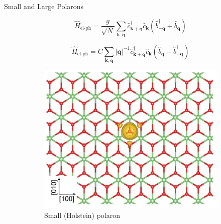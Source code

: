 \documentclass[11pt, xcolor=dvipsnames, aspectratio=43]{beamer}
\newcommand{\oper}[1]{\hat{#1}}
\renewcommand{\vec}[1]{\mathbf{\boldsymbol{#1}}}
\newcommand{\adjoint}[1]{#1^\dagger}
\newcommand{\adjop}[1]{\adjoint{\oper{#1}}}
\begin{document}
\begin{frame}{Small and Large Polarons}
    \begin{minipage}{0.49\textwidth}
        \footnotesize
        \begin{equation*}
            \oper{H}_\text{el-ph} = \frac{g}{\sqrt{N}}\sum_{\vec{k}, \vec{q}} \adjop{c}_{\vec{k}+\vec{q}} \oper{c}_\vec{k} (\adjop{b}_{-\vec{q}} + \oper{b}_\vec{q})
        \end{equation*}
    \end{minipage}
    \begin{minipage}{0.49\textwidth}
        \footnotesize
        \begin{equation*}
            \oper{H}_\text{el-ph} = C \sum_{\vec{k},\vec{q}} \left| \vec{q} \right|^{-1}\adjop{c}_{\vec{k}+\vec{q}}\oper{c}_{\vec{k}} (\oper{b}_{\vec{q}} + \adjop{b}_{-\vec{q}})
        \end{equation*}
    \end{minipage}
    \begin{figure}[p]
        \begin{subfigure}[b]{0.42\textwidth}
            \centering
            \includegraphics[width=\textwidth]{figures/small.png}
            \caption{Small (Holstein) polaron}
            \label{fig:small}
        \end{subfigure}
        \hfill
        \begin{subfigure}[b]{0.49\textwidth}
            \centering

\end{subfigure}
\end{figure}
\end{frame}
\end{document}
